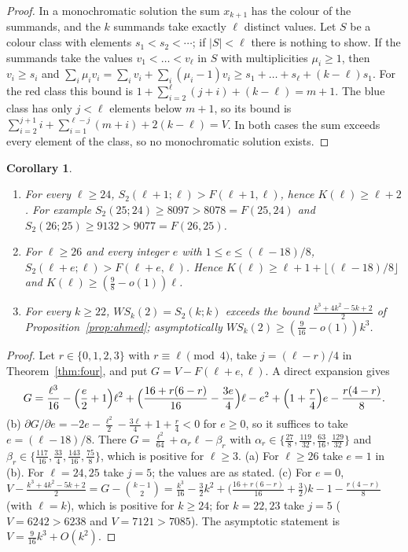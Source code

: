 \documentclass[11pt]{amsart}
\newtheorem{corollary}[theorem]{Corollary}
\theoremstyle{definition}
\newcommand{\F}{F}
\newcommand{\Stwo}{S_2}
\begin{document}
\begin{proof}
In a monochromatic solution the sum $x_{k+1}$ has the colour of the summands, and the $k$ summands take exactly $\ell$ distinct values. Let $S$ be a colour class with elements $s_1<s_2<\cdots$; if $|S|<\ell$ there is nothing to show. If the summands take the values $v_1<\dots<v_\ell$ in $S$ with multiplicities $\mu_i\ge1$, then $v_i\ge s_i$ and $\sum_i\mu_iv_i=\sum_iv_i+\sum_i(\mu_i-1)v_i\ge s_1+\dots+s_\ell+(k-\ell)s_1$. For the red class this bound is $1+\sum_{i=2}^{\ell}(j+i)+(k-\ell)=m+1$. The blue class has only $j<\ell$ elements below $m+1$, so its bound is $\sum_{i=2}^{j+1}i+\sum_{i=1}^{\ell-j}(m+i)+2(k-\ell)=V$. In both cases the sum exceeds every element of the class, so no monochromatic solution exists.
\end{proof}

\begin{corollary}\label{cor:four}
\begin{enumerate}[label=(\alph*)]
\item For every $\ell\ge24$, $\Stwo(\ell+1;\ell)>\F(\ell+1,\ell)$, hence $K(\ell)\ge\ell+2$. For example $\Stwo(25;24)\ge8097>8078=\F(25,24)$ and $\Stwo(26;25)\ge9132>9077=\F(26,25)$.
\item For $\ell\ge26$ and every integer $e$ with $1\le e\le(\ell-18)/8$, $\Stwo(\ell+e;\ell)>\F(\ell+e,\ell)$. Hence $K(\ell)\ge\ell+1+\lfloor(\ell-18)/8\rfloor$ and $K(\ell)\ge(\tfrac98-o(1))\ell$.
\item For every $k\ge22$, $WS_k(2)=\Stwo(k;k)$ exceeds the bound $\frac{k^3+4k^2-5k+2}{2}$ of Proposition~\ref{prop:ahmed}; asymptotically $WS_k(2)\ge(\tfrac9{16}-o(1))k^3$.
\end{enumerate}
\end{corollary}

\begin{proof}
Let $r\in\{0,1,2,3\}$ with $r\equiv\ell\pmod4$, take $j=(\ell-r)/4$ in Theorem~\ref{thm:four}, and put $G=V-\F(\ell+e,\ell)$. A direct expansion gives
\[
G=\frac{\ell^3}{16}-\Bigl(\frac e2+1\Bigr)\ell^2+\Bigl(\frac{16+r(6-r)}{16}-\frac{3e}{4}\Bigr)\ell-e^2+\Bigl(1+\frac r4\Bigr)e-\frac{r(4-r)}{8}.
\]
(b) $\partial G/\partial e=-2e-\frac{\ell^2}{2}-\frac{3\ell}{4}+1+\frac r4<0$ for $e\ge0$, so it suffices to take $e=(\ell-18)/8$. There $G=\frac{\ell^2}{64}+\alpha_r\ell-\beta_r$ with $\alpha_r\in\{\frac{27}{8},\frac{119}{32},\frac{63}{16},\frac{129}{32}\}$ and $\beta_r\in\{\frac{117}{16},\frac{33}{4},\frac{143}{16},\frac{75}{8}\}$, which is positive for $\ell\ge3$.
(a) For $\ell\ge26$ take $e=1$ in (b). For $\ell=24,25$ take $j=5$; the values are as stated.
(c) For $e=0$, $V-\frac{k^3+4k^2-5k+2}{2}=G-\binom{k-1}{2}=\frac{k^3}{16}-\frac32k^2+\bigl(\frac{16+r(6-r)}{16}+\frac32\bigr)k-1-\frac{r(4-r)}{8}$ (with $\ell=k$), which is positive for $k\ge24$; for $k=22,23$ take $j=5$ ($V=6242>6238$ and $V=7121>7085$). The asymptotic statement is $V=\frac{9}{16}k^3+O(k^2)$.
\end{proof}
\end{document}
